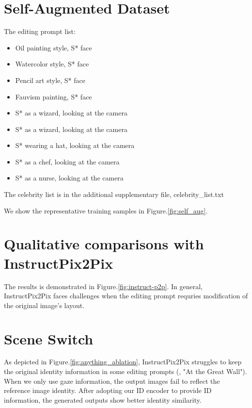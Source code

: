 \documentclass{article}
\begin{document}
\section{Self-Augmented Dataset}\label{Self-Aug}
 The editing prompt list:
\begin{itemize}
\item  Oil painting style, S* face
\item  Watercolor style, S* face
\item  Pencil art style, S* face
\item  Fauvism painting, S* face
\item  S* as a wizard, looking at the camera
\item  S* as a wizard, looking at the camera
\item  S* wearing a hat, looking at the camera
\item  S* as a chef, looking at the camera
\item  S* as a nurse, looking at the camera
\end{itemize}

 The celebrity list is in the additional supplementary file, celebrity\_list.txt 

We show the representative training samples in Figure.\ref{fig:self_aug}. 



\section{Qualitative comparisons with InstructPix2Pix\cite{brooks2022instructpix2pix}} \label{InstructPix2Pix}
The results is demonstrated in Figure.\ref{fig:instruct-p2p}. In general, InstructPix2Pix faces challenges when the editing
prompt requries modification of the original image's layout.


\section{Scene Switch}\label{scene}


As depicted in Figure.\ref{fig:anything_ablation}, InstructPix2Pix\cite{brooks2022instructpix2pix} struggles to keep the original identity information in some editing prompts (\eg, "At the Great Wall"). When we only use gaze information, the output images fail to reflect the reference image identity. After adopting our ID encoder to provide ID information, the generated outputs show better identity similarity.
\end{document}
